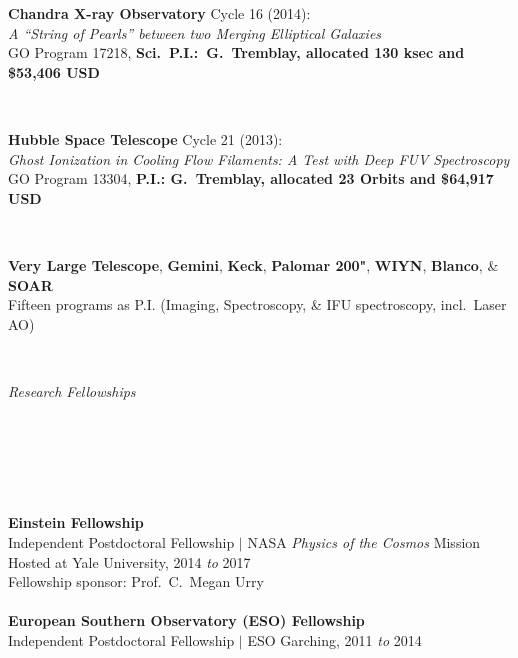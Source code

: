 \documentclass[11pt]{article}
\begin{document}
\vspace{4mm}

\hspace{42mm} \parbox{5.15in}{\textbf{Chandra X-ray Observatory} Cycle 16 (2014): \\ \textit{A ``String of Pearls'' between two Merging
Elliptical Galaxies} \\ GO Program 17218, \textbf{Sci.~P.I.:~G.~Tremblay, allocated 130 ksec and \$53,406 USD}}\\

\vspace{4mm}


\hspace{42mm} \parbox{5.15in}{\textbf{Hubble Space Telescope} Cycle 21 (2013): \\ \textit{Ghost Ionization in Cooling Flow Filaments: A Test with Deep FUV Spectroscopy} \\ GO Program 13304, \textbf{P.I.: G.~Tremblay, allocated 23 Orbits and \$64,917 USD}}\\


\vspace{4mm}

\hspace{42mm} \parbox{5.15in}{\textbf{Very Large Telescope}, \textbf{Gemini}, \textbf{Keck}, \textbf{Palomar 200"}, \textbf{WIYN}, \textbf{Blanco}, \& \textbf{SOAR} \\ Fifteen programs as P.I. (Imaging, Spectroscopy, \& IFU spectroscopy, incl.~Laser AO)} \\

\vspace{6mm}


\hspace{2.5mm} \parbox{1.5in}{\textit{Research Fellowships \\ \\ \\ \\ \\ \\}} \parbox{5.15in}{\textbf{Einstein Fellowship} \\ Independent Postdoctoral Fellowship $|$ NASA \textit{Physics of the Cosmos} Mission
\\ Hosted at Yale University, 2014 \textit{to} 2017
\\ Fellowship sponsor: Prof.~C.~Megan Urry
\\ \\ \textbf{European Southern Observatory (ESO) Fellowship} \\ Independent Postdoctoral Fellowship $|$ ESO Garching, 2011 \textit{to} 2014} \\
\end{document}
